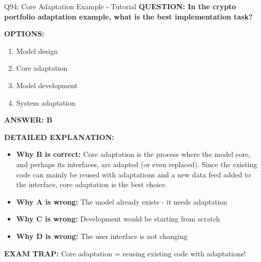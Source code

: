 \documentclass[8pt]{beamer}
\begin{document}
	\begin{frame}{Q94: Core Adaptation Example - Tutorial}
		\fontsize{6.5}{7.5}\selectfont
		\textbf{QUESTION: In the crypto portfolio adaptation example, what is the best implementation task?}
		
		\vspace{0.1cm}
		\textbf{OPTIONS:}
		\begin{enumerate}
			\item Model design
			\item Core adaptation
			\item Model development
			\item System adaptation
		\end{enumerate}
		
		\vspace{0.1cm}
		\textcolor{myblue}{\textbf{ANSWER: B}}
		
		\vspace{0.1cm}
		\textbf{DETAILED EXPLANATION:}
		\begin{itemize}
			\item \textbf{Why B is correct:} Core adaptation is the process where the model core, and perhaps its interfaces, are adapted (or even replaced). Since the existing code can mainly be reused with adaptations and a new data feed added to the interface, core adaptation is the best choice.
			\item \textbf{Why A is wrong:} The model already exists - it needs adaptation
			\item \textbf{Why C is wrong:} Development would be starting from scratch
			\item \textbf{Why D is wrong:} The user interface is not changing
		\end{itemize}
		
		\textcolor{myred}{\textbf{EXAM TRAP:}} Core adaptation = \textcolor{myblue}{reusing existing code with adaptations}!
	\end{frame}
	
\end{document}

